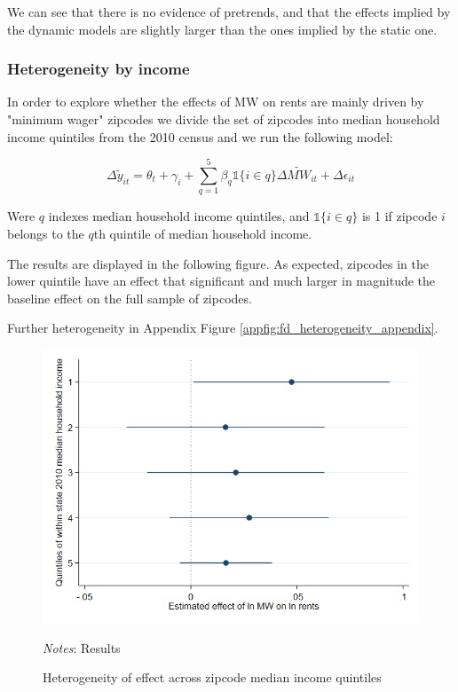     We can see that there is no evidence of pretrends, and that the effects implied by the dynamic models are slightly larger than the ones implied by the static one.  
    
    
    \subsubsection{Heterogeneity by income}
    
    In order to explore whether the effects of MW on rents are mainly driven by "minimum wager" zipcodes we divide the set of zipcodes into median household income quintiles from the 2010 census and we run the following model:
    
    \begin{equation}\label{eq:diff_main}
            \Delta \tilde{y}_{it} = \theta_t + \gamma_i + \sum_{q=1}^5 \beta_q \mathds{1}\{i\in q\} \Delta \tilde{MW}_{it}+ \Delta \epsilon_{it}
    \end{equation}
    
    Were $q$ indexes median household income quintiles, and $\mathds{1}\{i\in q\}$ is 1 if zipcode $i$ belongs to the $q$th quintile of median household income. 
    
    The results are displayed in the following figure. As expected, zipcodes in the lower quintile have an effect that significant and much larger in magnitude the baseline effect on the full sample of zipcodes.
    
    Further heterogeneity in Appendix Figure \ref{appfig:fd_heterogeneity_appendix}.
    
    \begin{figure}[h!] \centering
        \caption{Heterogeneity of effect across zipcode median income quintiles}
        \label{fig:fd_heterogeneity_income}
        \includegraphics[width=0.75\linewidth]{analysis/first_differences/output/fd_static_heter_med_hhinc20105.png}
        \begin{minipage}{.95\textwidth} \footnotesize
			\vspace{2mm} 
			\textit{Notes}: Results 
		\end{minipage}
    \end{figure}
    
